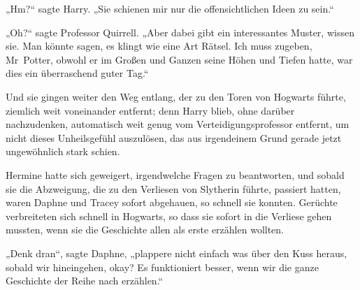 „Hm?“ sagte Harry.
„Sie schienen mir nur die offensichtlichen Ideen zu sein.“

„Oh?“ sagte Professor Quirrell.
„Aber dabei gibt ein interessantes Muster, wissen sie. Man könnte sagen, es klingt wie eine Art Rätsel. Ich muss zugeben, Mr~Potter, obwohl er im Großen und Ganzen seine Höhen und Tiefen hatte, war dies ein überraschend guter Tag.“

Und sie gingen weiter den Weg entlang, der zu den Toren von Hogwarts führte, ziemlich weit voneinander entfernt; denn Harry blieb, ohne darüber nachzudenken, automatisch weit genug vom Verteidigungsprofessor entfernt, um nicht dieses Unheilsgefühl auszulösen, das aus irgendeinem Grund gerade jetzt ungewöhnlich stark schien.


Hermine hatte sich geweigert, irgendwelche Fragen zu beantworten, und sobald sie die Abzweigung, die zu den Verliesen von Slytherin führte, passiert hatten, waren Daphne und Tracey sofort abgehauen, so schnell sie konnten. Gerüchte verbreiteten sich schnell in Hogwarts, so dass sie sofort in die Verliese gehen mussten, wenn sie die Geschichte allen als erste erzählen wollten.

„Denk dran“, sagte Daphne, „plappere nicht einfach was über den Kuss heraus, sobald wir hineingehen, okay? Es funktioniert besser, wenn wir die ganze Geschichte der Reihe nach erzählen.“

